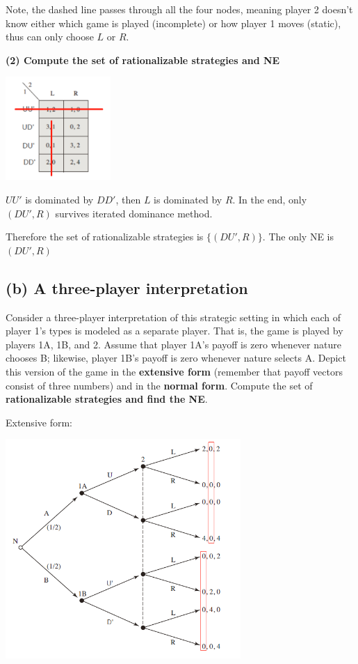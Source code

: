 \documentclass{article}
\begin{document}
\begin{mdframed}[backgroundcolor=blue!20,linecolor=white]
Note, the dashed line passes through all the four nodes, meaning player 2 doesn't know either which game is played (incomplete) or how player 1 moves (static), thus can only choose $L$ or $R$.
\end{mdframed}


\textbf{(2) Compute the set of rationalizable strategies and NE}
\begin{center}
\includegraphics[width=0.3\textwidth]{9.q26_3_b3}
\end{center}

$UU'$ is dominated by $DD'$, then $L$ is dominated by $R$. In the end, only $(DU',R)$ survives iterated dominance method. 

\vspace{1mm}

Therefore the set of rationalizable strategies is $\{(DU',R)\}$. The only NE is $(DU',R)$
\subsection*{(b) A three-player interpretation } 
Consider a three-player interpretation of this strategic setting in which each of player 1's types is modeled as a separate player. That is, the
game is played by players 1A, 1B, and 2. Assume that player 1A's
payoff is zero whenever nature chooses B; likewise, player 1B's payoff
is zero whenever nature selects A. Depict this version of the game in the
\textbf{extensive form} (remember that payoff vectors consist of three numbers)
and in the \textbf{normal form}. Compute the set of \textbf{rationalizable strategies and
find the NE}.

\vspace{1mm}

Extensive form:

\begin{center}
\includegraphics[width=0.67\textwidth]{9.q26_3_b1}
\end{center}
\vspace{2mm}
\end{document}
